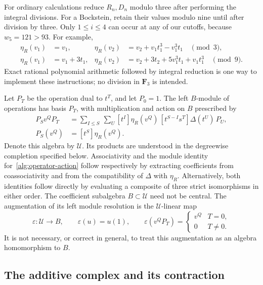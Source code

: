 \documentclass[11pt]{article}
\theoremstyle{definition}
\theoremstyle{remark}
\numberwithin{equation}{section}
\begin{document}
For ordinary calculations reduce $R_n,D_n$ modulo three after performing
the integral divisions.  For a Bockstein, retain their values modulo nine
until after division by three.  Only $1\leq i\leq4$ can occur at any of
our cutoffs, because $w_5=121>93$.  For example,
\begin{align*}
 \eta_R(v_1)&=v_1,&
 \eta_R(v_2)&=v_2+v_1t_1^3-v_1^3t_1\quad\pmod3,\\
 \eta_R(v_1)&=v_1+3t_1,&
 \eta_R(v_2)&=v_2+3t_2+5v_1^3t_1+v_1t_1^3\quad\pmod9.
\end{align*}
Exact rational polynomial arithmetic followed by integral reduction is
one way to implement these instructions; no division in $\mathbf F_3$ is intended.

Let $P_T$ be the operation dual to $t^T$, and let $P_0=1$.  The left
$B$-module of operations has basis $P_T$, with multiplication and action
on $B$ prescribed by
\begin{align}
 P_Sv^QP_T
 &=\sum_{I\leq S}\ \sum_U
       [t^I]\eta_R(v^Q)\,
       [t^{S-I}s^T]\Delta(t^U)\,P_U,
       \label{alg:operator-product}\\
 P_S(v^Q)&=[t^S]\eta_R(v^Q).
       \label{alg:operator-action}
\end{align}
Denote this algebra by $\mathcal U$.  Its products are understood in the
degreewise completion specified below.  Associativity and the module
identity for~\eqref{alg:operator-action} follow respectively by extracting
coefficients from coassociativity and from the compatibility of
$\Delta$ with $\eta_R$.  Alternatively, both identities follow directly
by evaluating a composite of three strict isomorphisms in either order.
The coefficient subalgebra $B\subset\mathcal U$ need not be central.
The augmentation of its left module resolution is the $\mathcal U$-linear
map
\begin{equation}\label{alg:augmentation}
 \varepsilon:\mathcal U\longrightarrow B,
 \qquad \varepsilon(u)=u(1),\qquad
 \varepsilon(v^QP_T)=
 \begin{cases}v^Q&T=0,\\0&T\ne0.\end{cases}
\end{equation}
It is not necessary, or correct in general, to treat this augmentation
as an algebra homomorphism to $B$.

\subsection{The additive complex and its contraction}
\end{document}
